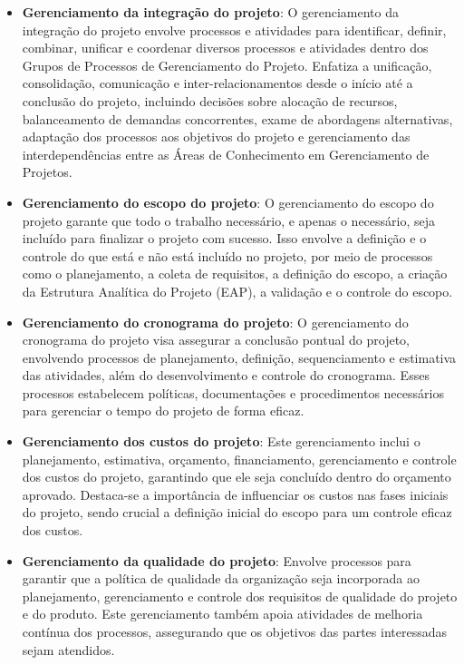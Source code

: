 \documentclass[
	12pt,
	openright,
	twoside,
	a4paper,
	english,
	brazil
	]{abntex2}
\begin{document}
\begin{itemize}
  \item \textbf{Gerenciamento da integração do projeto}: O gerenciamento da integração do projeto envolve processos e atividades para identificar, definir, combinar, unificar e coordenar diversos processos e atividades dentro dos Grupos de Processos de Gerenciamento do Projeto. Enfatiza a unificação, consolidação, comunicação e inter-relacionamentos desde o início até a conclusão do projeto, incluindo decisões sobre alocação de recursos, balanceamento de demandas concorrentes, exame de abordagens alternativas, adaptação dos processos aos objetivos do projeto e gerenciamento das interdependências entre as Áreas de Conhecimento em Gerenciamento de Projetos.
  \item \textbf{Gerenciamento do escopo do projeto}: O gerenciamento do escopo do projeto garante que todo o trabalho necessário, e apenas o necessário, seja incluído para finalizar o projeto com sucesso. Isso envolve a definição e o controle do que está e não está incluído no projeto, por meio de processos como o planejamento, a coleta de requisitos, a definição do escopo, a criação da Estrutura Analítica do Projeto (EAP), a validação e o controle do escopo. 
  \item \textbf{Gerenciamento do cronograma do projeto}: O gerenciamento do cronograma do projeto visa assegurar a conclusão pontual do projeto, envolvendo processos de planejamento, definição, sequenciamento e estimativa das atividades, além do desenvolvimento e controle do cronograma. Esses processos estabelecem políticas, documentações e procedimentos necessários para gerenciar o tempo do projeto de forma eficaz.
  \item \textbf{Gerenciamento dos custos do projeto}: Este gerenciamento inclui o planejamento, estimativa, orçamento, financiamento, gerenciamento e controle dos custos do projeto, garantindo que ele seja concluído dentro do orçamento aprovado. Destaca-se a importância de influenciar os custos nas fases iniciais do projeto, sendo crucial a definição inicial do escopo para um controle eficaz dos custos.
  \item \textbf{Gerenciamento da qualidade do projeto}: Envolve processos para garantir que a política de qualidade da organização seja incorporada ao planejamento, gerenciamento e controle dos requisitos de qualidade do projeto e do produto. Este gerenciamento também apoia atividades de melhoria contínua dos processos, assegurando que os objetivos das partes interessadas sejam atendidos.

\end{itemize}
\end{document}
